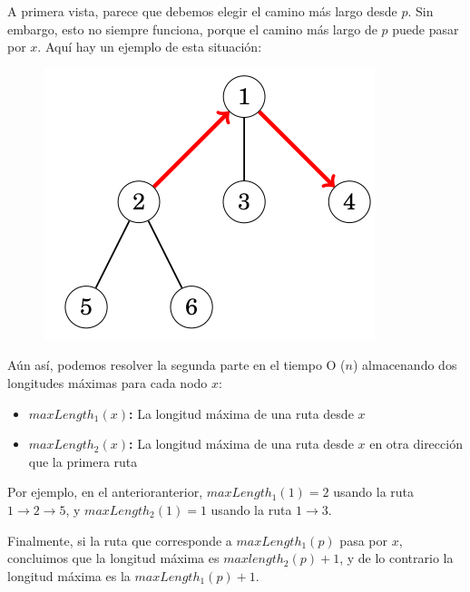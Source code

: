 A primera vista, parece que debemos elegir el camino más largo desde $p$. Sin embargo, esto no siempre funciona, porque el camino más largo de $p$ puede pasar por $x$. Aquí hay un ejemplo de esta situación:

\begin{figure}[h!]
	\centering
	\includegraphics[width=0.4\linewidth]{img/all_longest_paths_5}
	
	\label{fig:alllongestpaths5}
\end{figure}

Aún así, podemos resolver la segunda parte en el tiempo O ($n$) almacenando dos longitudes máximas para cada nodo $x$:

\begin{itemize}
	\item \textbf{$maxLength_1(x)$:} La longitud máxima de una ruta desde $x$
	\item \textbf{$maxLength_2(x)$:} La longitud máxima de una ruta desde $x$ en otra dirección que la primera ruta
\end{itemize}
Por ejemplo, en el anterioranterior, $maxLength_1(1)=2$ usando la ruta $1 \rightarrow 2 \rightarrow 5$, y $maxLength_2(1)=1$ usando la ruta $1 \rightarrow 3$.

Finalmente, si la ruta que corresponde a $maxLength_1(p)$ pasa por $x$, concluimos que la longitud máxima es $maxlength_2(p)+1$, y de lo contrario la longitud máxima es la $maxLength_1(p)+1$.